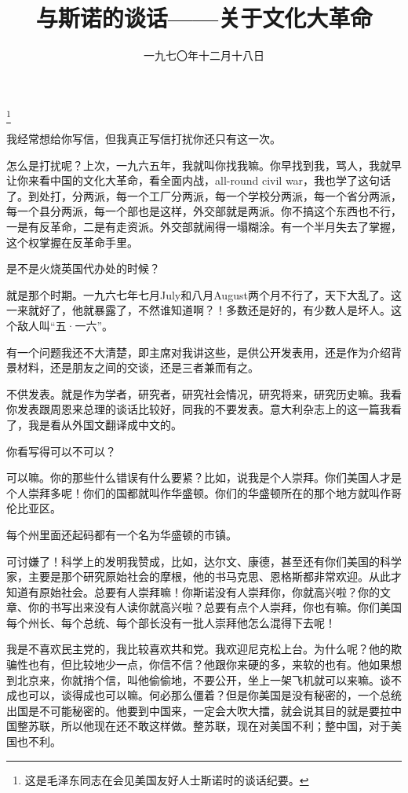 
\title{与斯诺的谈话——关于文化大革命}
\date{一九七〇年十二月十八日}
\thanks{这是毛泽东同志在会见美国友好人士斯诺时的谈话纪要。}
\maketitle


我经常想给你写信，但我真正写信打扰你还只有这一次。

怎么是打扰呢？上次，一九六五年，我就叫你找我嘛。你早找到我，骂人，我就早让你来看中国的文化大革命，看全面内战，all-round civil war，我也学了这句话了。到处打，分两派，每一个工厂分两派，每一个学校分两派，每一个省分两派，每一个县分两派，每一个部也是这样，外交部就是两派。你不搞这个东西也不行，一是有反革命，二是有走资派。外交部就闹得一塌糊涂。有一个半月失去了掌握，这个权掌握在反革命手里。

是不是火烧英国代办处的时候？

就是那个时期。一九六七年七月July和八月August两个月不行了，天下大乱了。这一来就好了，他就暴露了，不然谁知道啊？！多数还是好的，有少数人是坏人。这个敌人叫“五·一六”。

有一个问题我还不大清楚，即主席对我讲这些，是供公开发表用，还是作为介绍背景材料，还是朋友之间的交谈，还是三者兼而有之。

不供发表。就是作为学者，研究者，研究社会情况，研究将来，研究历史嘛。我看你发表跟周恩来总理的谈话比较好，同我的不要发表。意大利杂志上的这一篇我看了，我是看从外国文翻译成中文的。

你看写得可以不可以？

可以嘛。你的那些什么错误有什么要紧？比如，说我是个人崇拜。你们美国人才是个人崇拜多呢！你们的国都就叫作华盛顿。你们的华盛顿所在的那个地方就叫作哥伦比亚区。

每个州里面还起码都有一个名为华盛顿的市镇。

可讨嫌了！科学上的发明我赞成，比如，达尔文、康德，甚至还有你们美国的科学家，主要是那个研究原始社会的摩根，他的书马克思、恩格斯都非常欢迎。从此才知道有原始社会。总要有人崇拜嘛！你斯诺没有人崇拜你，你就高兴啦？你的文章、你的书写出来没有人读你就高兴啦？总要有点个人崇拜，你也有嘛。你们美国每个州长、每个总统、每个部长没有一批人崇拜他怎么混得下去呢！

我是不喜欢民主党的，我比较喜欢共和党。我欢迎尼克松上台。为什么呢？他的欺骗性也有，但比较地少一点，你信不信？他跟你来硬的多，来软的也有。他如果想到北京来，你就捎个信，叫他偷偷地，不要公开，坐上一架飞机就可以来嘛。谈不成也可以，谈得成也可以嘛。何必那么僵着？但是你美国是没有秘密的，一个总统出国是不可能秘密的。他要到中国来，一定会大吹大擂，就会说其目的就是要拉中国整苏联，所以他现在还不敢这样做。整苏联，现在对美国不利；整中国，对于美国也不利。

